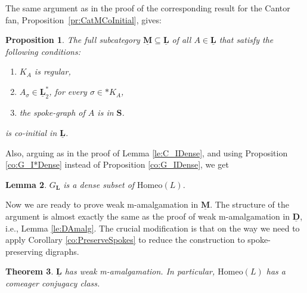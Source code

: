 \documentclass[12pt]{amsart}
\numberwithin{equation}{section}
\theoremstyle{plain}
\newtheorem{theorem}{Theorem}[section]
\newtheorem{lemma}[theorem]{Lemma}
\newtheorem{proposition}[theorem]{\bf Proposition}
\theoremstyle{definition}
\newcommand \Homeo{ \mbox{Homeo}}
\newcommand \LLb{\mathbf{L}}
\newcommand \SSb{\mathbf{S}}
\newcommand \DDub{\underline{\mathbf{D}}}
\newcommand \LLub{\underline{\mathbf{L}}}
\newcommand \MMub{\underline{\mathbf{M}}}
\begin{document}
The same argument as in the proof of the corresponding result for the Cantor fan, Proposition~\ref{pr:CatMCoInitial}, gives:

\begin{proposition}
	The full subcategory $\MMub \subseteq \LLub$ of all $A \in \LLub$ that satisfy the following conditions:
	\begin{enumerate}
		\item $K_{A}$ is regular,
		\item $A_\sigma \in \LLub_2^*$, for every $\sigma \in *K_A$,
		\item the spoke-graph of $A$ is in $\SSb$.
	\end{enumerate}
	is co-initial in $\LLub$.
\end{proposition}
%
Also, arguing as in the proof of Lemma \ref{le:C_IDense}, and using Proposition \ref{co:G_I*Dense}  instead of Proposition \ref{co:G_IDense}, we get

\begin{lemma}
	\label{le:L_IDense}
	$G_\LLb$ is a dense subset of $\Homeo(L)$.
\end{lemma}

Now we are ready to prove weak m-amalgamation in $\MMub$. The structure of the argument is almost exactly the same as the proof of weak m-amalgamation in $\DDub$, i.e., Lemma \ref{le:DAmalg}. The crucial modification is that on the way we need to apply Corollary \ref{co:PreserveSpokes} to reduce the construction to spoke-preserving digraphs.
 
\begin{theorem}
	$\LLub$  has weak m-amalgamation. In particular,  $\Homeo(L)$ has a comeager conjugacy class.
\end{theorem}
\end{document}
